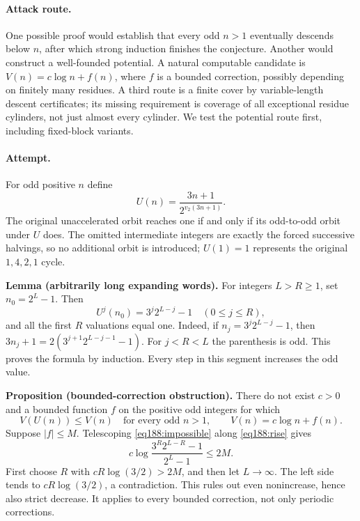 \documentclass[11pt,a4paper]{article}
\numberwithin{equation}{section}
\begin{document}
\paragraph{Attack route.}
One possible proof would establish that every odd $n>1$ eventually descends below $n$, after which strong induction finishes the conjecture. Another would construct a well-founded potential. A natural computable candidate is $V(n)=c\log n+f(n)$, where $f$ is a bounded correction, possibly depending on finitely many residues. A third route is a finite cover by variable-length descent certificates; its missing requirement is coverage of all exceptional residue cylinders, not just almost every cylinder. We test the potential route first, including fixed-block variants.

\paragraph{Attempt.}
For odd positive $n$ define
\[
 U(n)=\frac{3n+1}{2^{v_2(3n+1)}}.
\]
The original unaccelerated orbit reaches one if and only if its odd-to-odd orbit under $U$ does. The omitted intermediate integers are exactly the forced successive halvings, so no additional orbit is introduced; $U(1)=1$ represents the original $1,4,2,1$ cycle.

\textbf{Lemma (arbitrarily long expanding words).} For integers $L>R\ge1$, set $n_0=2^L-1$. Then
\begin{equation}\label{eq188:rise}
 U^j(n_0)=3^j2^{L-j}-1\quad(0\le j\le R),
\end{equation}
and all the first $R$ valuations equal one.
Indeed, if $n_j=3^j2^{L-j}-1$, then
$3n_j+1=2(3^{j+1}2^{L-j-1}-1)$. For $j<R<L$ the parenthesis is odd. This proves the formula by induction. Every step in this segment increases the odd value.

\textbf{Proposition (bounded-correction obstruction).} There do not exist $c>0$ and a bounded function $f$ on the positive odd integers for which
\begin{equation}\label{eq188:impossible}
 V(U(n))\le V(n)\quad\text{for every odd }n>1,
 \qquad V(n)=c\log n+f(n).
\end{equation}
Suppose $|f|\le M$. Telescoping \eqref{eq188:impossible} along \eqref{eq188:rise} gives
\[
 c\log\frac{3^R2^{L-R}-1}{2^L-1}\le2M.
\]
First choose $R$ with $cR\log(3/2)>2M$, and then let $L\to\infty$. The left side tends to $cR\log(3/2)$, a contradiction. This rules out even nonincrease, hence also strict decrease. It applies to every bounded correction, not only periodic corrections.
\end{document}
